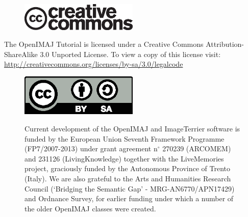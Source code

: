 \documentclass[10pt,a4paper,twoside,extrafontsizes]{memoir}
\begin{document}
\begin{figure}[h!]
\center
\includegraphics[width=0.5\textwidth]{cc-logo.eps}\\[0.5cm]
\end{figure}

The OpenIMAJ Tutorial is licensed under a Creative Commons Attribution-ShareAlike 3.0 Unported License. To view a copy of this license visit:\\
\url{http://creativecommons.org/licenses/by-sa/3.0/legalcode}
\\[0.5cm]

\begin{figure}[h!]
\center
\includegraphics[width=0.5\textwidth]{by-sa.eps}
\end{figure}

\begin{figure}[b!]
\begin{minipage}{\textwidth}
Current development of the OpenIMAJ and ImageTerrier software is funded by the European Union Seventh Framework Programme (FP7/2007-2013) under grant agreement n$^{\circ}$ 270239 (ARCOMEM) and 231126 (LivingKnowledge) together with the LiveMemories project, graciously funded by the Autonomous Province of Trento (Italy). We are also grateful to the Arts and Humanities Research Council (`Bridging the Semantic Gap' - MRG-AN6770/APN17429) and Ordnance Survey, for earlier funding under which a number of the older OpenIMAJ classes were created.
\end{minipage}
\end{figure}
\cleardoublepage
{}
\tableofcontents*









\end{document}
